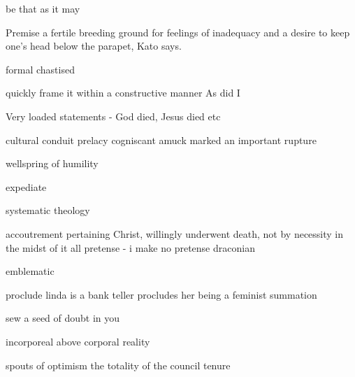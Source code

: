 be that as it may

Premise
 a fertile breeding ground for feelings of inadequacy and a desire to keep one’s head below the parapet, Kato says.

formal
chastised

quickly frame it within a constructive manner
As did I

Very loaded statements - God died, Jesus died etc


cultural conduit
prelacy
cogniscant
amuck
marked an important rupture

wellspring of humility

expediate

systematic theology


accoutrement
pertaining
Christ, willingly underwent death, not by necessity
in the midst of it all
pretense - i make no pretense
draconian

emblematic


proclude
linda is a bank teller procludes her being a feminist
summation

sew a seed of doubt in you

incorporeal above corporal reality

spouts of optimism
the totality of the council
tenure



